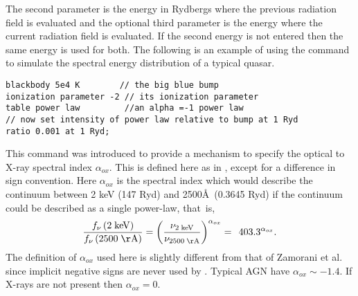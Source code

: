 The second parameter is the energy in Rydbergs where the previous
radiation field is evaluated and the optional third parameter
is the energy
where the current radiation field is evaluated.
If the second energy is not
entered then the same energy is used for both.
The following is an example
of using the  command to simulate the
spectral energy distribution of a typical quasar.
\begin{verbatim}
blackbody 5e4 K        // the big blue bump
ionization parameter -2 // its ionization parameter
table power law         //an alpha =-1 power law
// now set intensity of power law relative to bump at 1 Ryd
ratio 0.001 at 1 Ryd;
\end{verbatim}
This command was introduced to provide a mechanism to specify the optical
to X-ray spectral index $\alpha_{ox}$.
This is defined here as in \citet{Zamorani1981}, except for a difference in sign convention.
Here $\alpha_{ox}$ is the spectral
index which would describe the continuum between 2 keV (147 Ryd) and
2500\AA\ (0.3645 Ryd) if the continuum could be described
as a single power-law, that~is,
\begin{equation}
\frac{{f_\nu  \left( {2\;{\mathrm{keV}}} \right)}}{{f_\nu  \left(
{2500\;{\mathrm{{\AA}}}} \right)}} = \left( {\frac{{\nu _{2\;{\mathrm{keV}}} }}{{\nu
_{2500\;{\mathrm{{\AA}}}} }}} \right)^{\alpha _{ox} }  = \,\;403.3^{\alpha _{ox}
} .%
\end{equation}
The definition of $\alpha_{ox}$ used here is slightly different
from that of Zamorani et al. since implicit negative signs are
never used by \Cloudy.
Typical AGN have $\alpha_{ox}\sim  -1.4$.
If X-rays are not present then
$\alpha_{ox} = 0$.

